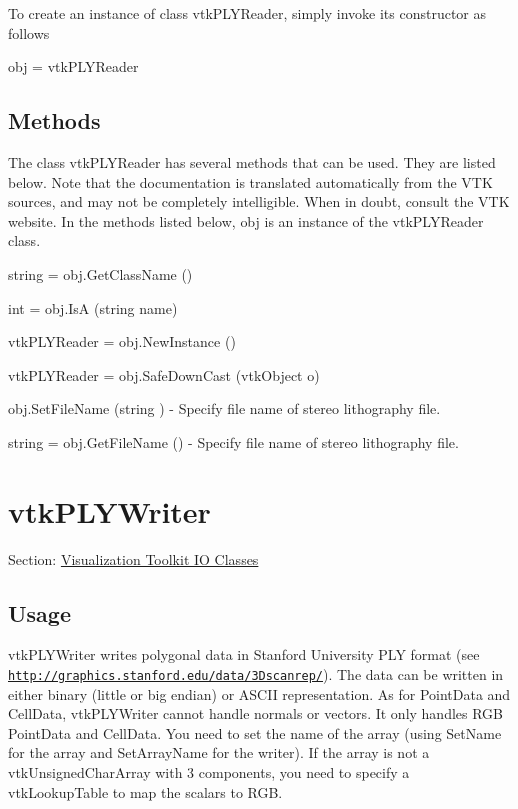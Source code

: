 To create an instance of class vtk\-P\-L\-Y\-Reader, simply invoke its constructor as follows \begin{DoxyVerb}  obj = vtkPLYReader
\end{DoxyVerb}
 \hypertarget{vtkwidgets_vtkxyplotwidget_Methods}{}\subsection{Methods}\label{vtkwidgets_vtkxyplotwidget_Methods}
The class vtk\-P\-L\-Y\-Reader has several methods that can be used. They are listed below. Note that the documentation is translated automatically from the V\-T\-K sources, and may not be completely intelligible. When in doubt, consult the V\-T\-K website. In the methods listed below, {\ttfamily obj} is an instance of the vtk\-P\-L\-Y\-Reader class. 
\begin{DoxyItemize}
\item {\ttfamily string = obj.\-Get\-Class\-Name ()}  
\item {\ttfamily int = obj.\-Is\-A (string name)}  
\item {\ttfamily vtk\-P\-L\-Y\-Reader = obj.\-New\-Instance ()}  
\item {\ttfamily vtk\-P\-L\-Y\-Reader = obj.\-Safe\-Down\-Cast (vtk\-Object o)}  
\item {\ttfamily obj.\-Set\-File\-Name (string )} -\/ Specify file name of stereo lithography file.  
\item {\ttfamily string = obj.\-Get\-File\-Name ()} -\/ Specify file name of stereo lithography file.  
\end{DoxyItemize}\hypertarget{vtkio_vtkplywriter}{}\section{vtk\-P\-L\-Y\-Writer}\label{vtkio_vtkplywriter}
Section\-: \hyperlink{sec_vtkio}{Visualization Toolkit I\-O Classes} \hypertarget{vtkwidgets_vtkxyplotwidget_Usage}{}\subsection{Usage}\label{vtkwidgets_vtkxyplotwidget_Usage}
vtk\-P\-L\-Y\-Writer writes polygonal data in Stanford University P\-L\-Y format (see \href{http://graphics.stanford.edu/data/3Dscanrep/}{\tt http\-://graphics.\-stanford.\-edu/data/3\-Dscanrep/}). The data can be written in either binary (little or big endian) or A\-S\-C\-I\-I representation. As for Point\-Data and Cell\-Data, vtk\-P\-L\-Y\-Writer cannot handle normals or vectors. It only handles R\-G\-B Point\-Data and Cell\-Data. You need to set the name of the array (using Set\-Name for the array and Set\-Array\-Name for the writer). If the array is not a vtk\-Unsigned\-Char\-Array with 3 components, you need to specify a vtk\-Lookup\-Table to map the scalars to R\-G\-B.

